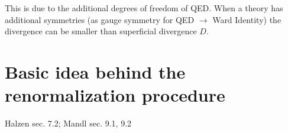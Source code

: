 \documentclass[TheoreticalPhy_ModB.tex]{subfiles}
\begin{document}
{\begin{comment}
&&\quad=\text{Electron Self-Energy}
\hspace {1.5cm}
&&D=1
\hspace {1cm}
&&\text{Log divergence}\\
&\begin{tikzpicture}[baseline=(e0)]
\begin{feynman}[small]
\vertex[blob](e0){\hspace {1cm}};
\vertex[above left=of e0](e1);
\vertex[above right=of e0](e2);
\vertex[below=of e0](e3);
\diagram*{
	(e0)--[photon](e1),
	(e0)--[photon](e2),
	(e0)--[photon](e3),
};
\end{feynman}
\end{tikzpicture}
&&\quad=\text{$3\gamma$}
\hspace {1.5cm}
&&D=1
\hspace {1cm}
&&\text{Vanishes}\\
&\begin{tikzpicture}[baseline=(e0)]
\begin{feynman}[small]
\vertex[blob](e0){\hspace {1cm}};
\vertex[above left=of e0](e1);
\vertex[above right=of e0](e2);
\vertex[below left=of e0](e3);
\vertex[below right=of e0](e4);
\diagram*{
	(e0)--[photon](e1),
	(e0)--[photon](e2),
	(e0)--[photon](e3),
	(e0)--[photon](e4),
};
\end{feynman}
\end{tikzpicture}
&&\quad=\text{$4\gamma$}
\hspace {1.5cm}
&&D=0
\hspace {1cm}
&&\text{Finite}\\
&\begin{tikzpicture}[baseline=(e0)]
\begin{feynman}[small]
\vertex[blob](e0){\hspace {1cm}};
\vertex[above left=of e0](e1);
\vertex[above right=of e0](e2);
\vertex[below=of e0](e3);
\diagram*{
	(e0)--(e1),
	(e0)--(e2),
	(e0)--[photon](e3),
};
\end{feynman}
\end{tikzpicture}
&&\quad=\text{Vertex}
\hspace {1.5cm}
&&D=0
\hspace {1cm}
&&\text{Log Divergence}\\
%
\end{alignat*}
\onlyinsubfile{\end{comment}}

This is due to the additional degrees of freedom of QED. When a theory has additional symmetries (as gauge symmetry for QED $\rightarrow$ Ward Identity) the divergence can be smaller than superficial divergence $D$.

\section{Basic idea behind the renormalization procedure}
\textsf{Halzen sec. 7.2; Mandl sec. 9.1, 9.2}
\end{document}
